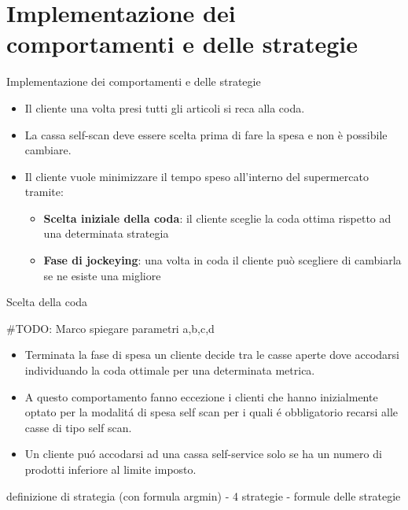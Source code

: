 \section{Implementazione dei comportamenti e delle strategie}





\begin{frame}{Implementazione dei comportamenti e delle strategie}
	\begin{itemize}
		\item Il cliente una volta presi tutti gli articoli si reca alla coda.
		\item La cassa self-scan deve essere scelta prima di fare la spesa e non è possibile cambiare.
		\item Il cliente vuole minimizzare il tempo speso all'interno del supermercato tramite:
		\begin{itemize}
			\item \textbf{Scelta iniziale della coda}: il cliente sceglie la coda ottima rispetto ad una determinata strategia
			\item \textbf{Fase di jockeying}: una volta in coda il cliente può scegliere di cambiarla se ne esiste una migliore
		\end{itemize}
	\end{itemize}
\end{frame}


\begin{frame}{Scelta della coda}
  \centering

  \#TODO: Marco spiegare parametri a,b,c,d

  \begin{itemize}
  \item Terminata la fase di spesa un cliente decide tra le casse
    aperte dove accodarsi individuando la coda ottimale per una
    determinata metrica.

  \item A questo comportamento fanno eccezione i clienti che hanno
    inizialmente optato per la modalitá di spesa self scan per i quali
    é obbligatorio recarsi alle casse di tipo self scan.

  \item Un cliente puó accodarsi ad una cassa self-service solo se ha
    un numero di prodotti inferiore al limite imposto.
  \end{itemize}
  
  definizione di strategia (con formula argmin) - 4 strategie -
  formule delle strategie
\end{frame}


